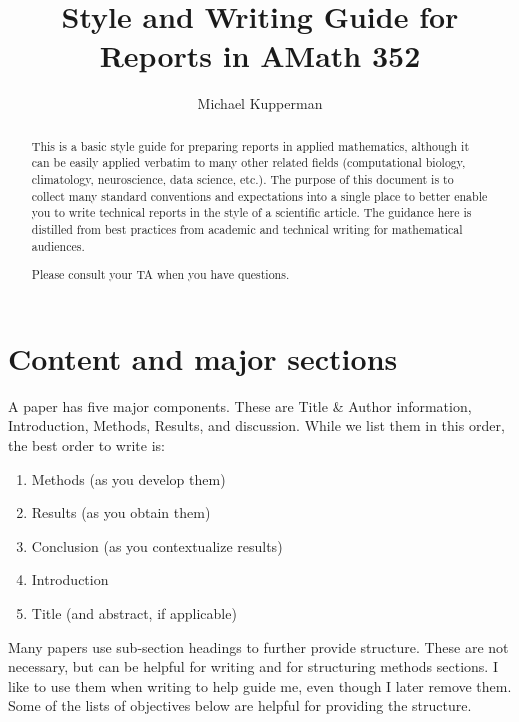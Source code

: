 \documentclass[]{article}
\title{Style and Writing Guide for Reports in AMath 352}
\author{Michael Kupperman}
\begin{document}
\maketitle
\begin{abstract}
    This is a basic style guide for preparing reports in applied mathematics, although it can be easily applied verbatim to many other related fields (computational biology, climatology, neuroscience, data science, etc.). The purpose of this document is to collect many standard conventions and expectations into a single place to better enable you to write technical reports in the style of a scientific article. The guidance here is distilled from best practices from academic and technical writing for mathematical audiences.

Please consult your TA when you have questions.

\end{abstract}
\tableofcontents



\section{Content and major sections}

A paper has five major components. These are Title \& Author information, Introduction, Methods, Results, and discussion. While we list them in this order, the best order to write is:

\begin{enumerate}
    \item Methods (as you develop them)
    \item Results (as you obtain them)
    \item Conclusion (as you contextualize results)
    \item Introduction
    \item Title (and abstract, if applicable)
\end{enumerate}
Many papers use sub-section headings to further provide structure. These are not necessary, but can be helpful for writing and for structuring methods sections.
I like to use them when writing to help guide me, even though I later remove them. Some of the lists of objectives below are helpful for providing the structure.
\end{document}
